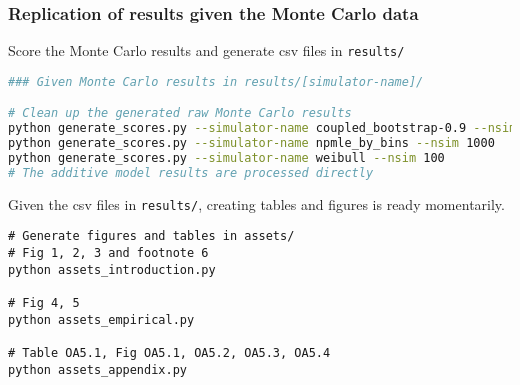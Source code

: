 \documentclass[10pt]{article}
\providecommand{\tightlist}{%
  \setlength{\itemsep}{0pt}\setlength{\parskip}{0pt}}
\begin{document}
\subsubsection*{Replication of results given the Monte Carlo data}

Score the Monte Carlo results and generate csv files in \texttt{results/}
\begin{lstlisting}[language=bash]
### Given Monte Carlo results in results/[simulator-name]/

# Clean up the generated raw Monte Carlo results
python generate_scores.py --simulator-name coupled_bootstrap-0.9 --nsim 1000
python generate_scores.py --simulator-name npmle_by_bins --nsim 1000
python generate_scores.py --simulator-name weibull --nsim 100
# The additive model results are processed directly
\end{lstlisting}


Given the csv files in \texttt{results/}, creating tables and figures is ready
momentarily.
\begin{lstlisting}
# Generate figures and tables in assets/
# Fig 1, 2, 3 and footnote 6
python assets_introduction.py

# Fig 4, 5
python assets_empirical.py

# Table OA5.1, Fig OA5.1, OA5.2, OA5.3, OA5.4
python assets_appendix.py
\end{lstlisting}


\end{document}

